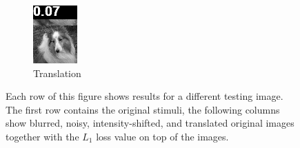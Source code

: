 \begin{figure}[H]
\begin{subfigure}[t]{0.15\textwidth}
    \includegraphics[width=\linewidth]{img/one-trial/loss_eval/L1/stimulus_1_image_shift_x_9_L1.png}
    \caption{Translation}
  \end{subfigure}
\caption{Each row of this figure shows results for a different testing image. The first row contains the original stimuli, the following columns show blurred, noisy, intensity-shifted, and translated original images together with the $L_1$ loss value on top of the images.}
\label{img:experiments:losses:L1}
\end{figure}




